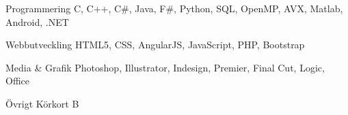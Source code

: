 

\begin{cvskills}

  \cvskill
    {Programmering} %
    {C, C++, C\#, Java, F\#, Python, SQL, OpenMP, AVX, Matlab, Android, .NET} %

  \cvskill
    {Webbutveckling} %
    {HTML5, CSS, AngularJS, JavaScript, PHP, Bootstrap} %

  \cvskill
    {Media \& Grafik} %
    {Photoshop, Illustrator, Indesign, Premier, Final Cut, Logic, Office} %


  \cvskill
    {Övrigt} %
    {Körkort B} %

\end{cvskills}
